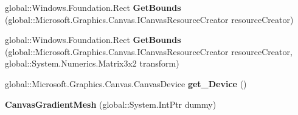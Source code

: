 \begin{DoxyCompactItemize}
\mbox{\label{class_microsoft_1_1_graphics_1_1_canvas_1_1_geometry_1_1_canvas_gradient_mesh_a3239426176127d3d80193f667dcd34f8}} 
global\+::\+Windows.\+Foundation.\+Rect {\bfseries Get\+Bounds} (global\+::\+Microsoft.\+Graphics.\+Canvas.\+I\+Canvas\+Resource\+Creator resource\+Creator)
\item 
\mbox{\label{class_microsoft_1_1_graphics_1_1_canvas_1_1_geometry_1_1_canvas_gradient_mesh_a446144d0cc83e13b8dab0cb1b480a549}} 
global\+::\+Windows.\+Foundation.\+Rect {\bfseries Get\+Bounds} (global\+::\+Microsoft.\+Graphics.\+Canvas.\+I\+Canvas\+Resource\+Creator resource\+Creator, global\+::\+System.\+Numerics.\+Matrix3x2 transform)
\item 
\mbox{\label{class_microsoft_1_1_graphics_1_1_canvas_1_1_geometry_1_1_canvas_gradient_mesh_aa06489c123c9a773e0a00e8dacd96bfd}} 
global\+::\+Microsoft.\+Graphics.\+Canvas.\+Canvas\+Device {\bfseries get\+\_\+\+Device} ()
\item 
\mbox{\label{class_microsoft_1_1_graphics_1_1_canvas_1_1_geometry_1_1_canvas_gradient_mesh_a7284f7e93f2c21e5bad79e6bbae86e49}} 
{\bfseries Canvas\+Gradient\+Mesh} (global\+::\+System.\+Int\+Ptr dummy)
\end{DoxyCompactItemize}
